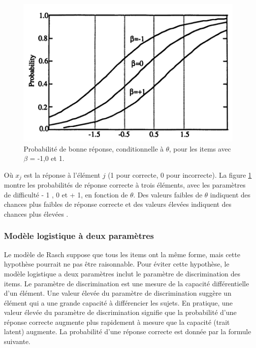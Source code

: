 \begin{figure}[H]
	\begin{center}
		\includegraphics[width=\textwidth]{images/chapitre5/parameters_probability.png}
	\end{center}
	\caption{Probabilité de bonne réponse, conditionnelle à \(\displaystyle \theta \), pour les items avec \(\displaystyle \beta \) = -1,0 et 1.}
	\label{parameters_probability}
\end{figure}
Où \(\displaystyle x_{j} \)  est la réponse à l'élément \(\displaystyle j \) (1 pour correcte, 0 pour incorrecte). La figure \ref{parameters_probability} montre les probabilités de réponse correcte à trois éléments, avec les paramètres de difficulté - 1 , 0 et + 1, en fonction de \(\displaystyle \theta \). Des valeurs faibles de \(\displaystyle \theta \) indiquent des chances plus faibles de réponse correcte et des valeurs élevées indiquent des chances plus élevées \cite{mislevy1994evidence}.

\subsubsection{Modèle logistique à deux paramètres}
Le modèle de Rasch suppose que tous les items ont la même forme, mais cette hypothèse pourrait ne pas être raisonnable. Pour éviter cette hypothèse, le modèle logistique a deux paramètres inclut le paramètre de discrimination des items. Le paramètre de discrimination est une mesure de la capacité différentielle d'un élément. Une valeur élevée du paramètre de discrimination suggère un élément qui a une grande capacité à différencier les sujets. En pratique, une valeur élevée du paramètre de discrimination signifie que la probabilité d'une réponse correcte augmente plus rapidement à mesure que la capacité (trait latent) augmente. La probabilité d'une réponse correcte est donnée par la formule suivante. \\

